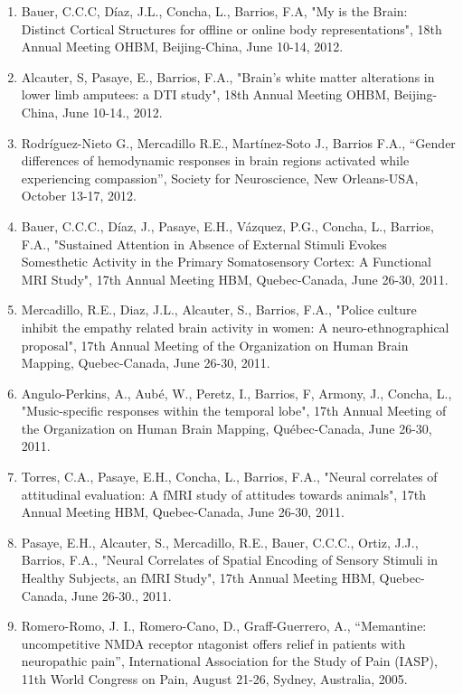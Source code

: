 \begin{enumerate}
\item Bauer, C.C.C, Díaz, J.L., Concha, L., Barrios, F.A, "My is the Brain: Distinct Cortical Structures for offline or 
online body representations", 18th Annual Meeting OHBM, Beijing-China, June 10-14, 2012.

\item Alcauter, S, Pasaye, E., Barrios, F.A., "Brain's white matter alterations in lower limb amputees: a DTI study", 18th 
Annual Meeting OHBM, Beijing-China, June 10-14., 2012.

\item Rodríguez-Nieto G., Mercadillo R.E., Martínez-Soto J., Barrios F.A., “Gender differences of hemodynamic responses in 
brain regions activated while experiencing compassion”, Society for Neuroscience, New Orleans-USA, October 13-17, 2012.

\item Bauer, C.C.C., Díaz, J., Pasaye, E.H., Vázquez, P.G., Concha, L., Barrios, F.A., "Sustained Attention in Absence of 
External Stimuli Evokes Somesthetic Activity in the Primary Somatosensory Cortex: A Functional MRI Study", 17th Annual 
Meeting HBM, Quebec-Canada, June 26-30, 2011.

\item Mercadillo, R.E., Diaz, J.L., Alcauter, S., Barrios, F.A., "Police culture inhibit the empathy related brain activity 
in women: A neuro-ethnographical proposal", 17th Annual Meeting of the Organization on Human Brain Mapping, Quebec-Canada, 
June 26-30, 2011.

\item Angulo-Perkins, A., Aubé, W., Peretz, I., Barrios, F, Armony, J., Concha, L., "Music-specific responses within the 
temporal lobe", 17th Annual Meeting of the Organization on Human Brain Mapping, Québec-Canada, June 26-30, 2011.

\item Torres, C.A., Pasaye, E.H., Concha, L., Barrios, F.A., "Neural correlates of attitudinal evaluation: A fMRI study of 
attitudes towards animals", 17th Annual Meeting HBM, Quebec-Canada, June 26-30, 2011.

\item Pasaye, E.H., Alcauter, S., Mercadillo, R.E., Bauer, C.C.C., Ortiz, J.J., Barrios, F.A., "Neural Correlates of Spatial 
Encoding of Sensory Stimuli in Healthy Subjects, an fMRI Study", 17th Annual Meeting HBM, Quebec-Canada, June 26-30., 
2011.

\item Romero-Romo, J. I., Romero-Cano, D., Graff-Guerrero, A., “Memantine: uncompetitive NMDA receptor ntagonist offers 
relief in patients with neuropathic pain”, International Association for the Study of Pain (IASP), 11th World Congress on 
Pain, August 21-26, Sydney, Australia, 2005.


\end{enumerate}
